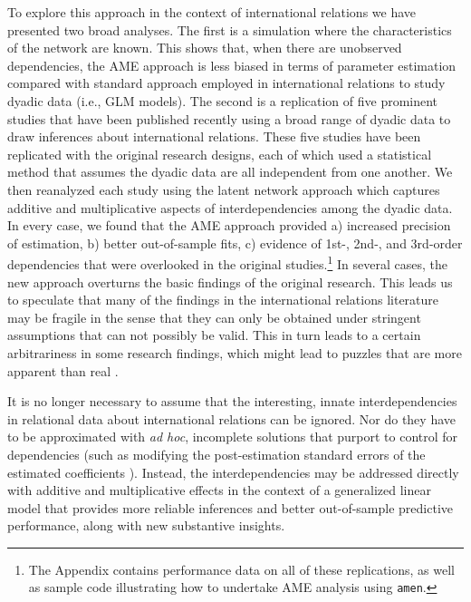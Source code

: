 To explore this approach in the context of international relations we have presented two broad analyses. The first is a simulation where the characteristics of the network are known. This shows that, when there are unobserved dependencies, the AME approach is less biased in terms of parameter estimation compared with standard approach employed in international relations to study dyadic data (i.e., GLM models). The second is a replication of five prominent studies that have been published recently using a broad range of dyadic data to draw inferences about international relations.  These five studies have been replicated with the original research designs, each of which used a statistical method that assumes the dyadic data are all independent from one another.  We then reanalyzed each study using the latent network approach which captures additive and multiplicative aspects of interdependencies among the dyadic data.  In every case, we found that the AME approach provided a) increased precision of estimation, b) better out-of-sample fits, c) evidence of 1st-, 2nd-, and 3rd-order dependencies that were overlooked in the original studies.\footnote{The Appendix contains performance data on all of these replications, as well as sample code illustrating how to undertake AME analysis using \texttt{amen}.} In several cases, the new approach overturns the basic findings of the original research.  This leads us to speculate that many of the findings in the international relations literature may be fragile in the sense that they can only be obtained under stringent assumptions that can not possibly be valid.  This in turn leads to a certain arbitrariness in some research findings, which might lead to puzzles that are more apparent than real \citep{zinnes:1980}.  

It is no longer necessary to assume that the interesting, innate interdependencies in relational data about international relations can be ignored. Nor do they have to be approximated with \textit{ad hoc}, incomplete solutions that purport to control for dependencies (such as modifying the post-estimation standard errors of the estimated coefficients \citep{king:roberts:2014}). Instead, the interdependencies may be addressed directly with additive and multiplicative effects in the context of a generalized linear model that provides more reliable inferences and better out-of-sample predictive performance, along with new substantive insights. 